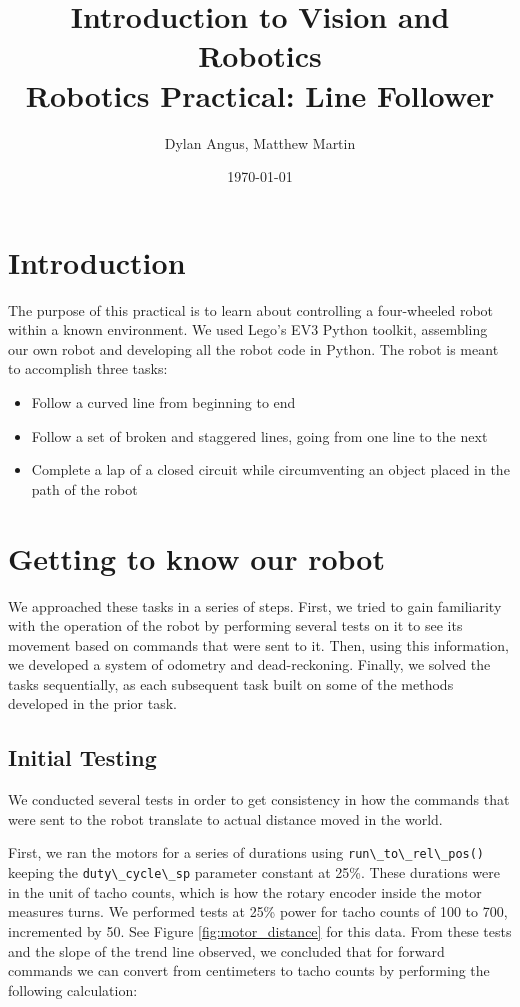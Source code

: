 \documentclass[12pt]{article}
\title{Introduction to Vision and Robotics\\Robotics Practical: Line Follower}
\author{Dylan Angus, Matthew Martin}
\date{\today}
\begin{document}
\newcommand{\code}[1]{
	\lstinline[basicstyle=\ttfamily]|#1|
}


\maketitle

\section{Introduction}

The purpose of this practical is to learn about controlling a four-wheeled robot within a known environment. We used Lego's EV3 Python toolkit, assembling our own robot and developing all the robot code in Python. The robot is meant to accomplish three tasks:

\begin{itemize}
	\item Follow a curved line from beginning to end
	\item Follow a set of broken and staggered lines, going from one line to the next
	\item Complete a lap of a closed circuit while circumventing an object placed in the path of the robot
\end{itemize}

\section{Getting to know our robot}

We approached these tasks in a series of steps. First, we tried to gain familiarity with the operation of the robot by performing several tests on it to see its movement based on commands that were sent to it. Then, using this information, we developed a system of odometry and dead-reckoning. Finally, we solved the tasks sequentially, as each subsequent task built on some of the methods developed in the prior task.

\subsection{Initial Testing}

We conducted several tests in order to get consistency in how the commands that were sent to the robot translate to actual distance moved in the world.

First, we ran the motors for a series of durations using \code{run\_to\_rel\_pos()} keeping the \code{duty\_cycle\_sp} parameter constant at 25\%. These durations were in the unit of tacho counts, which is how the rotary encoder inside the motor measures turns. We performed tests at 25\% power for tacho counts of 100 to 700, incremented by 50. See Figure \ref{fig:motor_distance} for this data. From these tests and the slope of the trend line observed, we concluded that for forward commands we can convert from centimeters to tacho counts by performing the following calculation:
\end{document}
